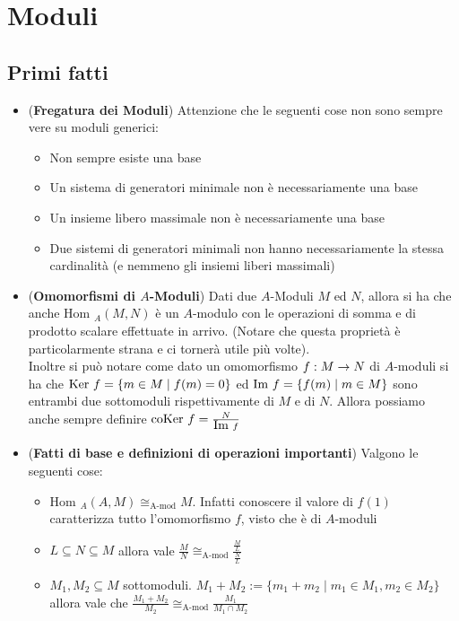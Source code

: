 \documentclass[a4paper,NoNotes,GeneralMath]{stdmdoc}
\newcommand{\Hom}{\text{Hom }}
\newcommand{\coKer}{\text{coKer }}
\begin{document}
	\section*{Moduli}
	\subsection*{Primi fatti}
	\begin{itemize}
		\item ({\bf Fregatura dei Moduli}) Attenzione che le seguenti cose non sono sempre vere su moduli generici:
			\begin{itemize}
				\item Non sempre esiste una base
				\item Un sistema di generatori minimale non è necessariamente una base
				\item Un insieme libero massimale non è necessariamente una base
				\item Due sistemi di generatori minimali non hanno necessariamente la stessa cardinalità (e nemmeno gli insiemi liberi massimali)
			\end{itemize}
		\item ({\bf Omomorfismi di $A$-Moduli}) Dati due $A$-Moduli $M$ ed $N$, allora si ha che anche $\Hom_A(M, N)$ è un $A$-modulo con le operazioni di somma e di prodotto scalare effettuate in arrivo. (Notare che questa proprietà è particolarmente strana e ci tornerà utile più volte). \\
		Inoltre si può notare come dato un omomorfismo $f: M \rightarrow N$ di $A$-moduli si ha che $\mbox{Ker } f = \{ m \in M \mid f(m) = 0 \}$ ed $\mbox{Im } f = \{ f(m) \mid m \in M \}$ sono entrambi due sottomoduli rispettivamente di $M$ e di $N$. Allora possiamo anche sempre definire $\coKer f = \frac{N}{\Img f}$
		\item ({\bf Fatti di base e definizioni di operazioni importanti}) Valgono le seguenti cose:
			\begin{itemize}
				\item $\Hom_A(A, M) \cong_{\text{A-mod}} M$. Infatti conoscere il valore di $f(1)$ caratterizza tutto l'omomorfismo $f$, visto che è di $A$-moduli
				\item $L \subseteq N \subseteq M$ allora vale $\frac{M}{N} \cong_{\text{A-mod}} \frac{\frac{M}{L}}{\frac{N}{L}}$
				\item $M_1, M_2 \subseteq M$ sottomoduli. $M_1 + M_2 := \{ m_1 + m_2 \mid m_1 \in M_1, m_2 \in M_2 \}$ allora vale che $\frac{M_1 + M_2}{M_2} \cong_{\text{A-mod}} \frac{M_1}{M_1 \cap M_2}$

\end{itemize}
\end{itemize}
\end{document}
